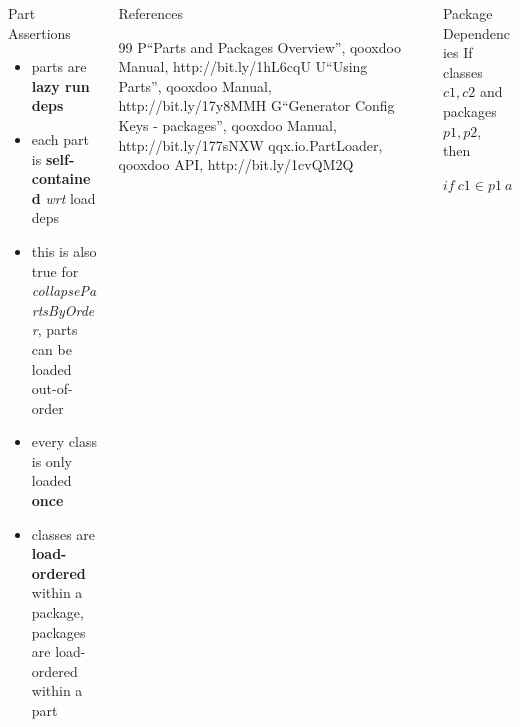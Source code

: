 \documentclass[final]{beamer}
\newlength{\sepwid}
\newlength{\onecolwid}
\newlength{\twocolwid}
\begin{document}
\begin{frame}[t]
\begin{columns}[t]
\begin{column}{\twocolwid}

    \begin{columns}[t,totalwidth=\twocolwid]
    \begin{column}{\onecolwid}
      \begin{block}{Part Assertions}
        \begin{itemize}
          \item parts are \textbf{lazy run deps}
          \item each part is \textbf{self-contained} \textit{wrt} load deps 
          \item this is also true for \textit{collapsePartsByOrder}, parts
            can be loaded out-of-order
          \item every class is only loaded \textbf{once}
          \item classes are \textbf{load-ordered} within a package, packages are
            load-ordered within a part
        \end{itemize}
      \end{block}

    \end{column}

    \begin{column}{\onecolwid}
      \begin{block}{References}
        \small{\begin{thebibliography}{99}
          \bibitem P``Parts and Packages Overview'', qooxdoo Manual, http://bit.ly/1hL6cqU
          \bibitem U``Using Parts'', qooxdoo Manual, http://bit.ly/17y8MMH
          \bibitem G``Generator Config Keys - packages'', qooxdoo Manual, http://bit.ly/177sNXW 
          \bibitem qqx.io.PartLoader, qooxdoo API, http://bit.ly/1cvQM2Q 
        \end{thebibliography}}
      \end{block}

    \end{column}

    \end{columns}
    \end{column}  %


    \begin{column}{\sepwid}\end{column}			%

    \begin{column}{\onecolwid}

      \begin{block}{Package Dependencies}
        If classes $c1, c2$ and packages $p1, p2$, then\\
        \begin{center}
          $if\ c1 \in p1\ and\ c2 \in p2\ and\ depends(c1,c2) \Rightarrow
          depends(p1,p2)$
        \end{center}
      \end{block}


\end{column}
\end{columns}
\end{frame}
\end{document}
